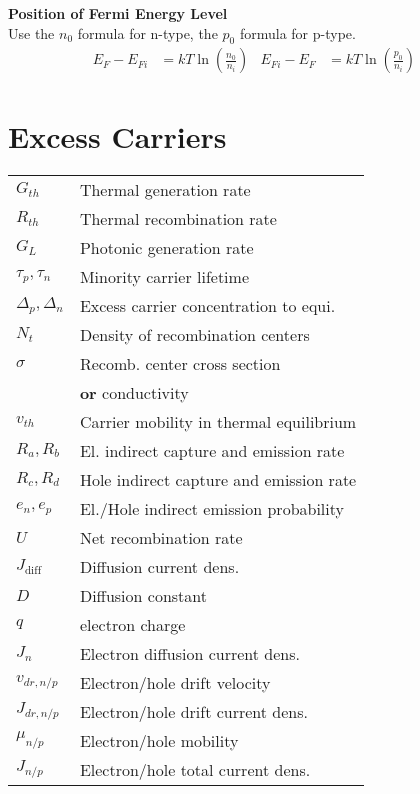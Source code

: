 \documentclass[a4paper, fontsize=8pt, landscape, DIV=1]{scrartcl}
\begin{document}
\begin{multicols*}{4}
    \textbf{Position of Fermi Energy Level} \\
    Use the $n_0$ formula for n-type, the $p_0$ formula for p-type.
      \begin{align*}
        E_F-E_{Fi} &= kT\ln\left(\frac{n_0}{n_i}\right) &
        E_{Fi}-E_{F} &= kT\ln\left(\frac{p_0}{n_i}\right) &
      \end{align*}

  \section{Excess Carriers}

  \ifdefined\makeultracompact
  \else
    \begin{tabular}[h]{l l}
      $G_{th}$   & Thermal generation rate \\
      $R_{th}$   & Thermal recombination rate \\
      $G_{L}$    & Photonic generation rate \\
      $\tau_p, \tau_n$   & Minority carrier lifetime \\
      $\Delta_p, \Delta_n$   & Excess carrier concentration to equi. \\
      $N_t$    & Density of recombination centers \\
      $\sigma$    & Recomb. center cross section \\
      {}    & \textbf{or} conductivity \\
      $v_{th}$    & Carrier mobility in thermal equilibrium \\
      $R_a,R_b$    & El. indirect capture and emission rate \\
      $R_c,R_d$    & Hole indirect capture and emission rate \\
      $e_n,e_p$    & El./Hole indirect emission probability \\
      $U$    & Net recombination rate \\
      $J_{\text{diff}}$ & Diffusion current dens. \\
      $D$ & Diffusion constant \\
      $q$ & electron charge \\
      $J_n$ & Electron diffusion current dens.\\
      $v_{dr,n/p}$ & Electron/hole drift velocity \\
      $J_{dr,n/p}$ & Electron/hole drift current dens.\\
      $\mu_{n/p}$ & Electron/hole mobility \\
      $J_{n/p}$ & Electron/hole total current dens. \\
    \end{tabular}
  \fi


\end{multicols*}
\end{document}

